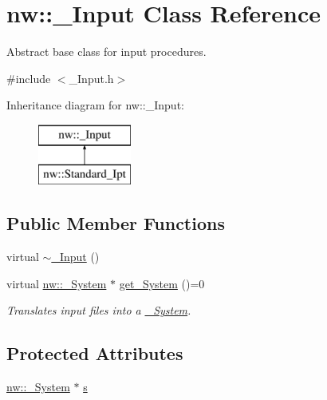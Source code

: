 \hypertarget{classnw_1_1___input}{\section{nw\+:\+:\+\_\+\+Input Class Reference}
\label{classnw_1_1___input}
}


Abstract base class for input procedures.  




{\ttfamily \#include $<$\+\_\+\+Input.\+h$>$}

Inheritance diagram for nw\+:\+:\+\_\+\+Input\+:\begin{figure}[H]
\begin{center}
\leavevmode
\includegraphics[height=2.000000cm]{dc/d65/classnw_1_1___input}
\end{center}
\end{figure}
\subsection*{Public Member Functions}
\begin{DoxyCompactItemize}
\item 
virtual \hyperlink{classnw_1_1___input_a6a1a98fe24120158898316797324d024}{$\sim$\+\_\+\+Input} ()
\item 
virtual \hyperlink{classnw_1_1___system}{nw\+::\+\_\+\+System} $\ast$ \hyperlink{classnw_1_1___input_a5bb57fdb6dfcf4efa7b64e096594a8b3}{get\+\_\+\+System} ()=0
\begin{DoxyCompactList}\small\item\em Translates input files into a \hyperlink{classnw_1_1___system}{\+\_\+\+System}. \end{DoxyCompactList}\end{DoxyCompactItemize}
\subsection*{Protected Attributes}
\begin{DoxyCompactItemize}
\item 
\hyperlink{classnw_1_1___system}{nw\+::\+\_\+\+System} $\ast$ \hyperlink{classnw_1_1___input_af4d5765ede8af8d7f981ef179683f7e5}{s}
\end{DoxyCompactItemize}


